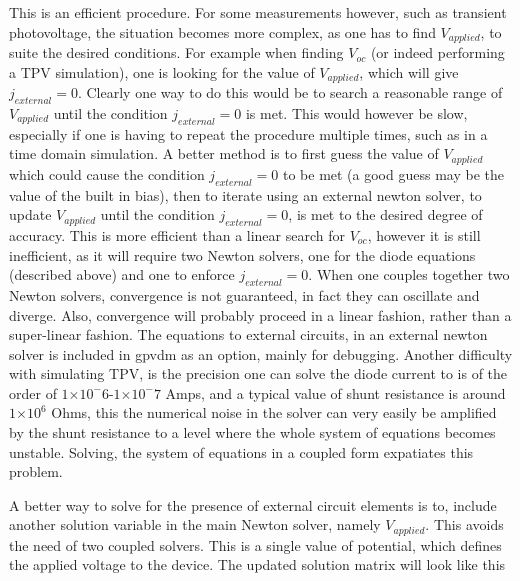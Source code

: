 \documentclass[11pt]{article}
\providecommand{\e}[1]{\ensuremath{\times 10^{#1}}}
\begin{document}
This is an efficient procedure.  For some measurements however, such as transient photovoltage, the situation becomes more complex, as one has to find $V_{applied}$, to suite the desired conditions.  For example when finding $V_{oc}$ (or indeed performing a TPV simulation), one is looking for the value of $V_{applied}$, which will give $j_{external}=0$.  Clearly one way to do this would be to search a reasonable range of $V_{applied}$ until the condition $j_{external}=0$ is met.  This would however be slow, especially if one is having to repeat the procedure multiple times, such as in a time domain simulation.  A better method is to first guess the value of $V_{applied}$ which could cause the condition $j_{external}=0$ to be met (a good guess may be the value of the built in bias), then to iterate using an external newton solver, to update $V_{applied}$ until the condition $j_{external}=0$, is met to the desired degree of accuracy.  This is more efficient than a linear search for $V_{oc}$, however it is still inefficient, as it will require two Newton solvers, one for the diode equations (described above) and one to enforce $j_{external}=0$.  When one couples together two Newton solvers, convergence is not guaranteed, in fact they can oscillate and diverge.  Also, convergence will probably proceed in a linear fashion, rather than a super-linear fashion.  The equations to external circuits, in an external newton solver is included in gpvdm as an option, mainly for debugging.  Another difficulty with simulating TPV, is the precision one can solve the diode current to is of the order of $1\e-6$-$1\e-7$ Amps, and a typical value of shunt resistance is around $1\e6$ Ohms, this the numerical noise in the solver can very easily be amplified by the shunt resistance to a level where the whole system of equations becomes unstable.  Solving, the system of equations in a coupled form expatiates this problem.

A better way to solve for the presence of external circuit elements is to, include another solution variable in the main Newton solver, namely $V_{applied}$.  This avoids the need of two coupled solvers.  This is a single value of potential, which defines the applied voltage to the device. The updated solution matrix will look like this
\end{document}
